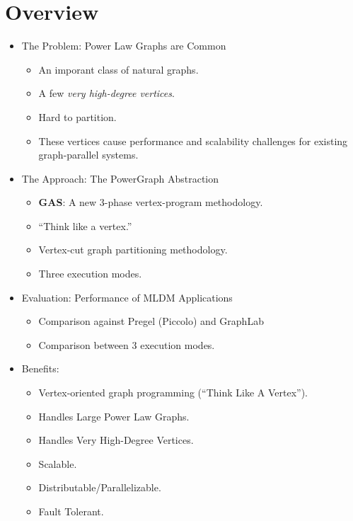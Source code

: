 \section*{Overview}

\begin{frame}
\begin{itemize}
  \frametitle{Overview}
  \item The Problem: Power Law Graphs are Common
  \begin{itemize}
    \item An imporant class of natural graphs.
    \item A few \textit{very high-degree vertices}.
    \item Hard to partition.
    \item These vertices cause performance and scalability challenges for
          existing graph-parallel systems.
  \end{itemize}
\end{itemize}
\end{frame}

\begin{frame}
\begin{itemize}
  \frametitle{Overview}
  \item The Approach: The PowerGraph Abstraction
  \begin{itemize}
    \item \textbf{GAS}: A new 3-phase vertex-program methodology.
    \item ``Think like a vertex.'' \citep[SIGMOD '10]{malewicz2010pregel}
    \item Vertex-cut graph partitioning methodology.
    \item Three execution modes.
  \end{itemize}

  \item Evaluation: Performance of MLDM Applications
  \begin{itemize}
    \item Comparison against Pregel (Piccolo) and GraphLab
    \item Comparison between 3 execution modes.
  \end{itemize}
\end{itemize}
\end{frame}

\begin{frame}
\begin{itemize}
  \frametitle{Overview}
  \item Benefits:
  \begin{itemize}
    \item Vertex-oriented graph programming (``Think Like A Vertex'').
    \item Handles Large Power Law Graphs.
    \item Handles Very High-Degree Vertices.
    \item Scalable.
    \item Distributable/Parallelizable.
    \item Fault Tolerant.
  \end{itemize}
\end{itemize}
\end{frame}

